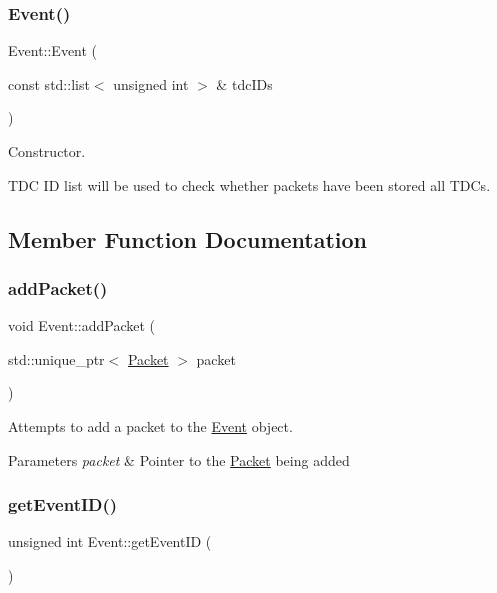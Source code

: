 \subsubsection{\texorpdfstring{Event()}{Event()}}
{\footnotesize\ttfamily Event\+::\+Event (\begin{DoxyParamCaption}\item[{const std\+::list$<$ unsigned int $>$ \&}]{tdc\+I\+Ds }\end{DoxyParamCaption})}



Constructor. 

T\+DC ID list will be used to check whether packets have been stored all T\+D\+Cs. 

\subsection{Member Function Documentation}
\mbox{\label{class_event_a08c4689086126f702d3b14be99461c98}} 
\subsubsection{\texorpdfstring{add\+Packet()}{addPacket()}}
{\footnotesize\ttfamily void Event\+::add\+Packet (\begin{DoxyParamCaption}\item[{std\+::unique\+\_\+ptr$<$ \hyperlink{class_packet}{Packet} $>$}]{packet }\end{DoxyParamCaption})}



Attempts to add a packet to the \hyperlink{class_event}{Event} object. 


\begin{DoxyParams}{Parameters}
{\em packet} & Pointer to the \hyperlink{class_packet}{Packet} being added \\
\hline
\end{DoxyParams}
\mbox{\label{class_event_a3f48bec589c70aa0d36fd5cb253ad88c}} 
\subsubsection{\texorpdfstring{get\+Event\+I\+D()}{getEventID()}}
{\footnotesize\ttfamily unsigned int Event\+::get\+Event\+ID (\begin{DoxyParamCaption}{ }\end{DoxyParamCaption})\hspace{0.3cm}{\ttfamily [inline]}}



